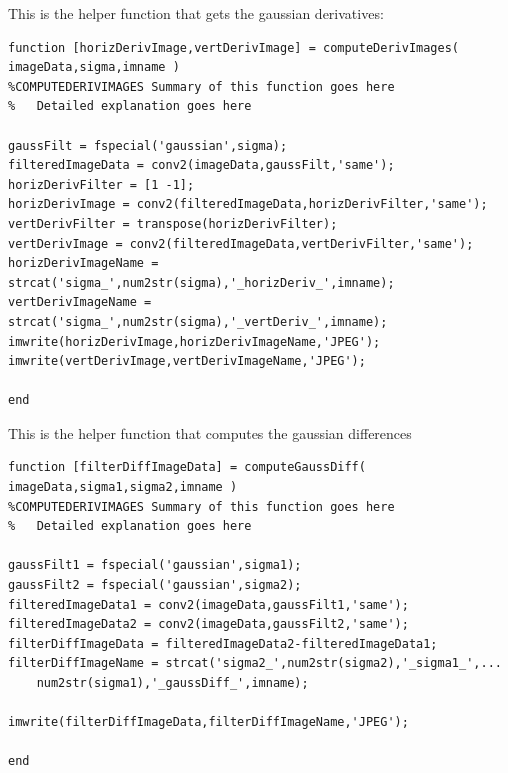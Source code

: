 \documentclass[11pt,psfig]{article}
\begin{document}
This is the helper function that gets the gaussian derivatives:

\begin{verbatim}
function [horizDerivImage,vertDerivImage] = computeDerivImages( imageData,sigma,imname )
%COMPUTEDERIVIMAGES Summary of this function goes here
%   Detailed explanation goes here

gaussFilt = fspecial('gaussian',sigma);
filteredImageData = conv2(imageData,gaussFilt,'same');
horizDerivFilter = [1 -1];
horizDerivImage = conv2(filteredImageData,horizDerivFilter,'same');
vertDerivFilter = transpose(horizDerivFilter);
vertDerivImage = conv2(filteredImageData,vertDerivFilter,'same');
horizDerivImageName = strcat('sigma_',num2str(sigma),'_horizDeriv_',imname);
vertDerivImageName = strcat('sigma_',num2str(sigma),'_vertDeriv_',imname);
imwrite(horizDerivImage,horizDerivImageName,'JPEG');
imwrite(vertDerivImage,vertDerivImageName,'JPEG');

end
\end{verbatim}

This is the helper function that computes the gaussian differences

\begin{verbatim}
function [filterDiffImageData] = computeGaussDiff( imageData,sigma1,sigma2,imname )
%COMPUTEDERIVIMAGES Summary of this function goes here
%   Detailed explanation goes here

gaussFilt1 = fspecial('gaussian',sigma1);
gaussFilt2 = fspecial('gaussian',sigma2);
filteredImageData1 = conv2(imageData,gaussFilt1,'same');
filteredImageData2 = conv2(imageData,gaussFilt2,'same');
filterDiffImageData = filteredImageData2-filteredImageData1;
filterDiffImageName = strcat('sigma2_',num2str(sigma2),'_sigma1_',...
    num2str(sigma1),'_gaussDiff_',imname);

imwrite(filterDiffImageData,filterDiffImageName,'JPEG');

end
\end{verbatim}
\end{document}
